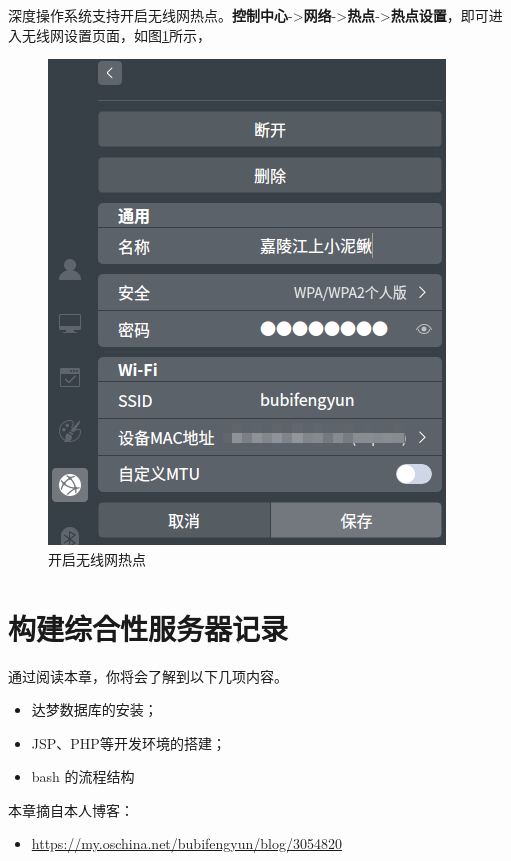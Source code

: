 \documentclass[doctor,openright,twoside]{sjtuthesis}
\providecommand{\tightlist}{%
    \setlength{\itemsep}{0pt}\setlength{\parskip}{0pt}}
\theoremstyle{plain}
\theoremstyle{definition}
\theoremstyle{remark}
\theoremstyle{ocrenumbox}
\theoremstyle{plain}
\begin{document}
深度操作系统支持开启无线网热点。\textbf{控制中心}-\textgreater{}\textbf{网络}-\textgreater{}\textbf{热点}-\textgreater{}\textbf{热点设置}，即可进入无线网设置页面，如图\ref{samba-hotwif}所示，

\begin{figure}
\centering
\includegraphics{images/samba-hotwifi.png}
\caption{开启无线网热点\label{samba-hotwif}}
\end{figure}

\hypertarget{section-130}{%
\chapter{\texorpdfstring{构建综合性服务器记录}{构建综合性服务器记录}}\label{section-130}}

通过阅读本章，你将会了解到以下几项内容。

\begin{itemize}
\tightlist
\item
  达梦数据库的安装；
\item
  JSP、PHP等开发环境的搭建；
\item
  bash 的流程结构
\end{itemize}

本章摘自本人博客：

\begin{itemize}
\tightlist
\item
  \url{https://my.oschina.net/bubifengyun/blog/3054820}
\end{itemize}
\end{document}
